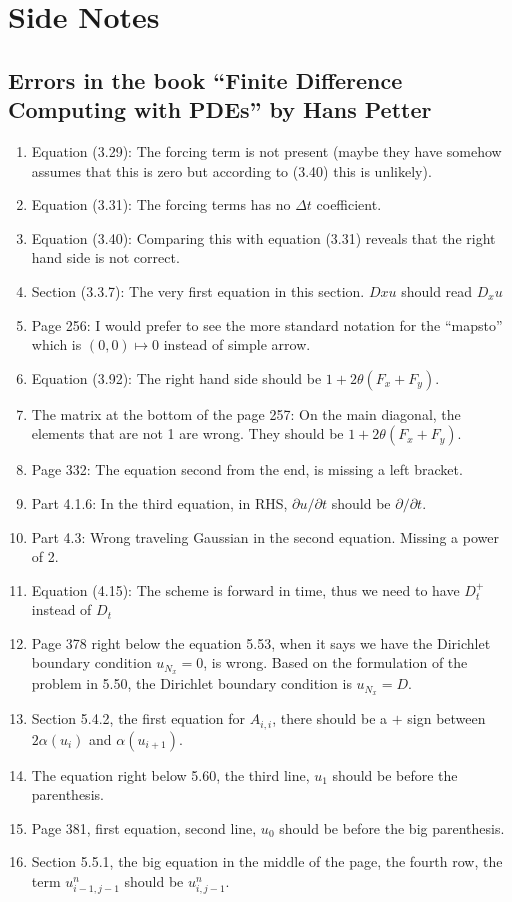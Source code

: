 \chapter{Side Notes}

\section{Errors in the book ``Finite Difference Computing with PDEs'' by Hans Petter}
\begin{enumerate}[noitemsep]
	\item Equation (3.29): The forcing term is not present (maybe they have somehow assumes that this is zero but according to (3.40) this is unlikely).
	\item Equation (3.31): The forcing terms has no $ \Delta t $ coefficient.
	\item Equation (3.40): Comparing this with equation (3.31) reveals that the right hand side is not correct.
	\item Section (3.3.7): The very first equation in this section. $ Dxu $ should read $ D_x u $
	\item Page 256: I would prefer to see the more standard notation for the ``mapsto'' which is $ (0,0) \mapsto 0 $ instead of simple arrow.
	\item Equation (3.92): The right hand side should be $ 1 + 2\theta (F_x+F_y) $.
	\item The matrix at the bottom of the page 257: On the main diagonal, the elements that are not 1 are wrong. They should be $ 1 + 2\theta(F_x+F_y) $.
	\item Page 332: The equation second from the end, is missing a left bracket.
	\item Part 4.1.6: In the third equation, in RHS, $ \partial u/\partial t $ should be $ \partial/\partial t $.
	\item Part 4.3: Wrong traveling Gaussian in the second equation. Missing a power of 2.
	\item Equation (4.15): The scheme is forward in time, thus we need to have $ D_t^+ $ instead of $ D_t $ 
	\item Page 378 right below the equation 5.53, when it says we have the Dirichlet boundary condition $ u_{N_x} = 0 $, is wrong. Based on the formulation of the problem in 5.50, the Dirichlet boundary condition is $ u_{N_x} = D $.
	\item Section 5.4.2, the first equation for $ A_{i,i} $, there should be a $ + $ sign between $ 2\alpha(u_i) $ and $ \alpha(u_{i+1}) $.
	\item The equation right below 5.60, the third line, $ u_1 $ should be before the parenthesis.
	\item Page 381, first equation, second line, $ u_0 $ should be before the big parenthesis.
	\item Section 5.5.1, the big equation in the middle of the page, the fourth row, the term $ u_{i-1,j-1}^n $ should be $ u_{i,j-1}^n $. 
\end{enumerate}